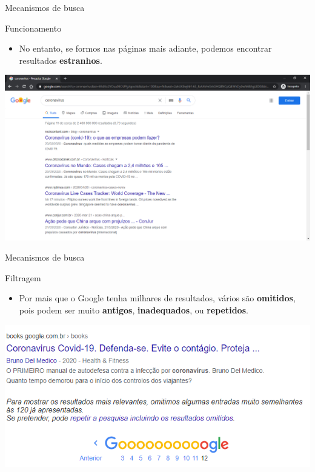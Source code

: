 \begin{frame}{Mecanismos de busca}
	\begin{block}{Funcionamento}
		\begin{itemize}
			\item No entanto, se formos nas páginas mais adiante, podemos encontrar resultados \textbf{estranhos}.
		\end{itemize}
	\end{block}

	\centering
	\includegraphics[width=0.9\linewidth]{Figuras/Ch03/fig6}
\end{frame}


\begin{frame}{Mecanismos de busca}
	\begin{block}{Filtragem}
		\begin{itemize}
			\item Por mais que o Google tenha milhares de resultados, vários são \textbf{omitidos}, pois podem ser muito \textbf{antigos}, \textbf{inadequados}, ou \textbf{repetidos}.
		\end{itemize}
	\end{block}

	\centering
	\includegraphics[width=0.9\linewidth]{Figuras/Ch03/fig7}
\end{frame}


